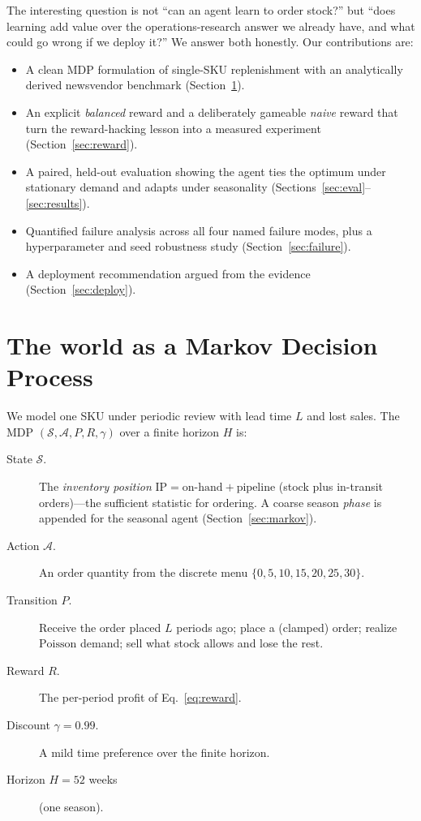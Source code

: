 \documentclass[11pt]{article}
\begin{document}
The interesting question is not ``can an agent learn to order stock?'' but ``does learning add
value over the operations-research answer we already have, and what could go wrong if we deploy
it?'' We answer both honestly. Our contributions are:
\begin{itemize}
  \item A clean MDP formulation of single-SKU replenishment with an analytically derived
        newsvendor benchmark (Section~\ref{sec:mdp}).
  \item An explicit \emph{balanced} reward and a deliberately gameable \emph{naive} reward that
        turn the reward-hacking lesson into a measured experiment (Section~\ref{sec:reward}).
  \item A paired, held-out evaluation showing the agent ties the optimum under stationary demand
        and adapts under seasonality (Sections~\ref{sec:eval}--\ref{sec:results}).
  \item Quantified failure analysis across all four named failure modes, plus a hyperparameter
        and seed robustness study (Section~\ref{sec:failure}).
  \item A deployment recommendation argued from the evidence (Section~\ref{sec:deploy}).
\end{itemize}

\section{The world as a Markov Decision Process}
\label{sec:mdp}

We model one SKU under periodic review with lead time $L$ and lost sales. The MDP
$(\mathcal{S},\mathcal{A},P,R,\gamma)$ over a finite horizon $H$ is:

\begin{description}
  \item[State $\mathcal{S}$.] The \emph{inventory position} $\mathrm{IP}=\text{on-hand}+\text{pipeline}$
        (stock plus in-transit orders)---the sufficient statistic for ordering. A coarse season
        \emph{phase} is appended for the seasonal agent (Section~\ref{sec:markov}).
  \item[Action $\mathcal{A}$.] An order quantity from the discrete menu
        $\{0,5,10,15,20,25,30\}$.
  \item[Transition $P$.] Receive the order placed $L$ periods ago; place a (clamped) order;
        realize $\mathrm{Poisson}$ demand; sell what stock allows and lose the rest.
  \item[Reward $R$.] The per-period profit of Eq.~\eqref{eq:reward}.
  \item[Discount $\gamma=0.99$.] A mild time preference over the finite horizon.
  \item[Horizon $H=52$ weeks] (one season).
\end{description}
\end{document}
